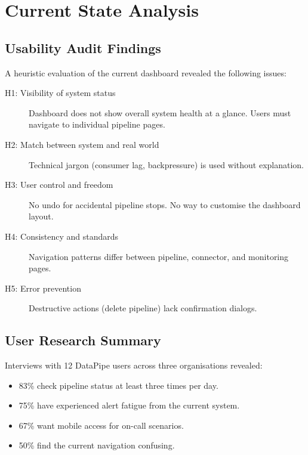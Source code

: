 \documentclass[
    language=english,
    doctype=technical-report,
    institution=none,
    titlestyle=book,
    oneside,
]{../../omnilatex}
\begin{document}
\chapter{Current State Analysis}
\label{sec:current-state}

\section{Usability Audit Findings}

A heuristic evaluation of the current dashboard revealed the following
issues:

\begin{description}
    \item[H1: Visibility of system status] Dashboard does not show overall
        system health at a glance. Users must navigate to individual
        pipeline pages.
    \item[H2: Match between system and real world] Technical jargon
        (consumer lag, backpressure) is used without explanation.
    \item[H3: User control and freedom] No undo for accidental pipeline
        stops. No way to customise the dashboard layout.
    \item[H4: Consistency and standards] Navigation patterns differ between
        pipeline, connector, and monitoring pages.
    \item[H5: Error prevention] Destructive actions (delete pipeline)
        lack confirmation dialogs.
\end{description}

\section{User Research Summary}

Interviews with 12 DataPipe users across three organisations revealed:

\begin{itemize}
    \item 83\% check pipeline status at least three times per day.
    \item 75\% have experienced alert fatigue from the current system.
    \item 67\% want mobile access for on-call scenarios.
    \item 50\% find the current navigation confusing.
\end{itemize}
\end{document}
